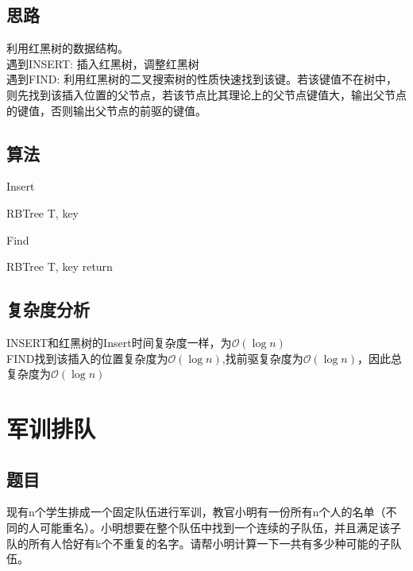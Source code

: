 \documentclass[UTF8]{ctexart}
\begin{document}
\subsection{思路}
利用红黑树的数据结构。\\
遇到INSERT: 插入红黑树，调整红黑树\\
遇到FIND: 利用红黑树的二叉搜索树的性质快速找到该键。若该键值不在树中，则先找到该插入位置的父节点，若该节点比其理论上的父节点键值大，输出父节点的键值，否则输出父节点的前驱的键值。
\subsection{算法}
\renewcommand{\algorithmicrequire}{\textbf{输入:}}
\renewcommand{\algorithmicensure}{\textbf{输出:}}
\begin{algorithm}
	\caption{Insert}
	\begin{algorithmic}[1]
	\Require RBTree T, key
	\end{algorithmic}
\end{algorithm}

\begin{algorithm}
	\caption{Find}
	\begin{algorithmic}[1]
	\Require RBTree T, key
		return
	\EndIf
		\Else
		\EndIf
	\Else
		\Else
		\EndIf
	\EndIf
	\end{algorithmic}
\end{algorithm}

\subsection{复杂度分析}
INSERT和红黑树的Insert时间复杂度一样，为$\mathcal{O}(\log n)$\\
FIND找到该插入的位置复杂度为$\mathcal{O}(\log n)$,找前驱复杂度为$\mathcal{O}(\log n)$，因此总复杂度为$\mathcal{O}(\log n)$

\section{军训排队}
\subsection{题目}
现有n个学生排成一个固定队伍进行军训，教官小明有一份所有n个人的名单（不同的人可能重名）。小明想要在整个队伍中找到一个连续的子队伍，并且满足该子队的所有人恰好有k个不重复的名字。请帮小明计算一下一共有多少种可能的子队伍。\\
\end{document}
